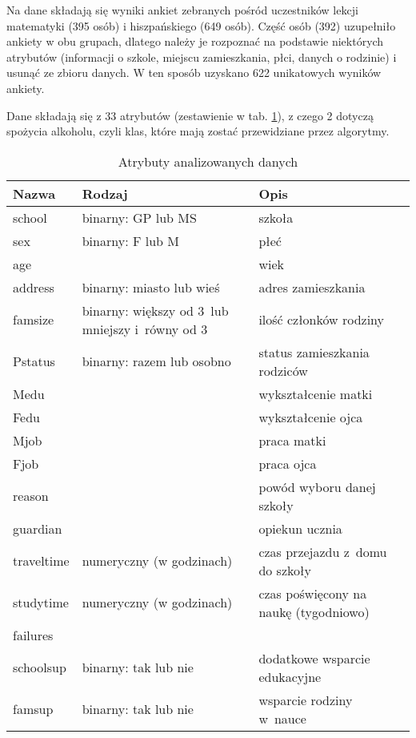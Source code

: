 Na dane składają się wyniki ankiet zebranych pośród uczestników lekcji matematyki (395 osób) i hiszpańskiego (649 osób). Część osób (392) uzupełniło ankiety w obu grupach, dlatego należy je rozpoznać na podstawie niektórych atrybutów (informacji o szkole, miejscu zamieszkania, płci, danych o rodzinie) i usunąć ze zbioru danych. W ten sposób uzyskano 622 unikatowych wyników ankiety.

Dane składają się z 33 atrybutów (zestawienie w tab. \ref{tab:attributes}), z czego 2 dotyczą spożycia alkoholu, czyli klas, które mają zostać przewidziane przez algorytmy. 
\begin{table}[h]
\centering
\caption{Atrybuty analizowanych danych}
\label{tab:attributes}
\begin{tabular}{|p{1.4cm}|p{3cm}|p{3cm}|}
\hline
Nazwa & Rodzaj & Opis \\ \hline
school   &     binarny: GP lub MS &   szkoła \\ \hline
sex   &   binarny: F lub M   &   płeć \\ \hline
age   &      &  wiek  \\ \hline
address   &   binarny: miasto lub wieś   &  adres zamieszkania  \\ \hline
famsize   &  binarny: większy od 3\ lub mniejszy i~równy od 3     &  ilość członków rodziny  \\ \hline
Pstatus   &  binarny: razem lub osobno    &  status zamieszkania rodziców  \\ \hline
Medu   &      &   wykształcenie matki \\ \hline
Fedu   &      &  wykształcenie ojca  \\ \hline
Mjob   &      &  praca matki  \\ \hline
Fjob   &      &  praca ojca  \\ \hline
reason   &      &   powód wyboru danej szkoły \\ \hline
guardian   &      &  opiekun ucznia  \\ \hline
traveltime   &   numeryczny (w godzinach)    &   czas przejazdu z~domu do szkoły    \\ \hline
studytime   &   numeryczny (w godzinach)   &  czas poświęcony na naukę (tygodniowo)  \\ \hline
failures   &      &    \\ \hline
schoolsup   &  binarny: tak lub nie  & dodatkowe wsparcie edukacyjne   \\ \hline
famsup   &   binarny: tak lub nie   &   wsparcie rodziny w~nauce \\ \hline

\end{tabular}
\end{table}
